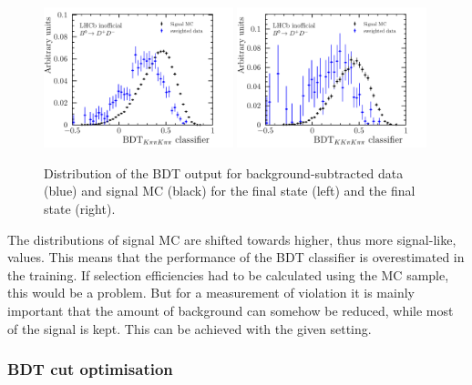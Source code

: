 \begin{figure}[htb]
    \centering
    \includegraphics[width=0.49\textwidth]{07-B02DD/tikz/pdf/BDTComparison_Kpipi.pdf}
    \includegraphics[width=0.49\textwidth]{07-B02DD/tikz/pdf/BDTComparison_KKpi.pdf}
    \caption{Distribution of the BDT output for background-subtracted data (blue) and
    signal MC (black) for the \KpipiKpipi final state (left) and the
    \KKpiKpipi final state (right).}
    \label{fig:b02dd:selection:mva:bdtcomparison}
\end{figure}
The distributions of signal MC are shifted towards higher, thus more
signal-like, values. This means that the performance of the BDT classifier is
overestimated in the training. If selection efficiencies had to be calculated
using the MC sample, this would be a problem. But for a measurement of \CP
violation it is mainly important that the amount of background can somehow be
reduced, while most of the signal is kept. This can be achieved with the given
setting.

\subsubsection*{BDT cut optimisation}
\label{sec:b02dd:selection:mva:optimisation}

